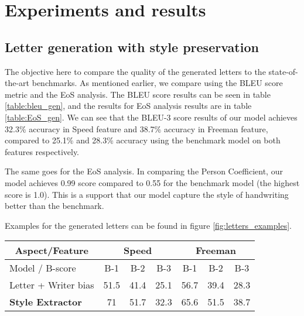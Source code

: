 \documentclass[conference]{IEEEtran}
\begin{document}
\section{Experiments and results}

\subsection{Letter generation with style preservation}
\par The objective here to compare the quality of the generated letters to the state-of-the-art benchmarks. As mentioned earlier, we compare using the BLEU score metric and the EoS analysis. 
The BLEU score results can be seen in table \ref{table:bleu_gen}, and the results for EoS analysis results are in table \ref{table:EoS_gen}. We can see that the BLEU-3 score results of our model achieves 32.3\% accuracy in Speed feature and 38.7\% accuracy in Freeman feature, compared to 25.1\% and 28.3\% accuracy using the benchmark model on both features respectively.
\par The same goes for the EoS analysis. In comparing the Person Coefficient, our model achieves 0.99 score compared to 0.55 for the benchmark model (the highest score is 1.0). This is a support that our model capture the style of handwriting better than the benchmark. 
\par Examples for the generated letters can be found in figure \ref{fig:letters_examples}.


\begin{table*}[!htbp]
\centering
\begin{tabular}{|l||c|c|c||c|c|c|} 
\hline
\multicolumn{1}{|c||}{Aspect/Feature} & \multicolumn{3}{c||}{ Speed } & \multicolumn{3}{c|}{ Freeman }   \\ \hline
Model / B-score      & B-1  & B-2  & B-3           & B-1  & B-2   & B-3              \\ \hline
Letter + Writer bias & 51.5 & 41.4 & 25.1          & 56.7 & 39.4  & 28.3             \\\hline
\textbf{Style Extractor} & 71 & 51.7 & 32.3 & 65.6 & 51.5 & 38.7 \\\hline
\end{tabular}
\caption{BLEU scores for different models for known writers.}
\label{table:bleu_gen}
\end{table*}
\end{document}

